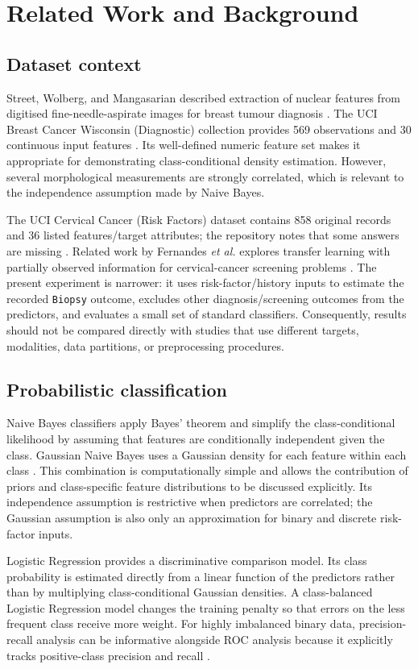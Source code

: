 \documentclass[conference]{IEEEtran}
\begin{document}
\section{Related Work and Background}
\subsection{Dataset context}
Street, Wolberg, and Mangasarian described extraction of nuclear features from digitised fine-needle-aspirate images for breast tumour diagnosis \cite{street}. The UCI Breast Cancer Wisconsin (Diagnostic) collection provides 569 observations and 30 continuous input features \cite{uciBreast}. Its well-defined numeric feature set makes it appropriate for demonstrating class-conditional density estimation. However, several morphological measurements are strongly correlated, which is relevant to the independence assumption made by Naive Bayes.

The UCI Cervical Cancer (Risk Factors) dataset contains 858 original records and 36 listed features/target attributes; the repository notes that some answers are missing \cite{uciCervical}. Related work by Fernandes \textit{et al.} explores transfer learning with partially observed information for cervical-cancer screening problems \cite{fernandes}. The present experiment is narrower: it uses risk-factor/history inputs to estimate the recorded \texttt{Biopsy} outcome, excludes other diagnosis/screening outcomes from the predictors, and evaluates a small set of standard classifiers. Consequently, results should not be compared directly with studies that use different targets, modalities, data partitions, or preprocessing procedures.

\subsection{Probabilistic classification}
Naive Bayes classifiers apply Bayes' theorem and simplify the class-conditional likelihood by assuming that features are conditionally independent given the class. Gaussian Naive Bayes uses a Gaussian density for each feature within each class \cite{bishop,sklearnNB}. This combination is computationally simple and allows the contribution of priors and class-specific feature distributions to be discussed explicitly. Its independence assumption is restrictive when predictors are correlated; the Gaussian assumption is also only an approximation for binary and discrete risk-factor inputs.

Logistic Regression provides a discriminative comparison model. Its class probability is estimated directly from a linear function of the predictors rather than by multiplying class-conditional Gaussian densities. A class-balanced Logistic Regression model changes the training penalty so that errors on the less frequent class receive more weight. For highly imbalanced binary data, precision-recall analysis can be informative alongside ROC analysis because it explicitly tracks positive-class precision and recall \cite{saito}.
\end{document}
